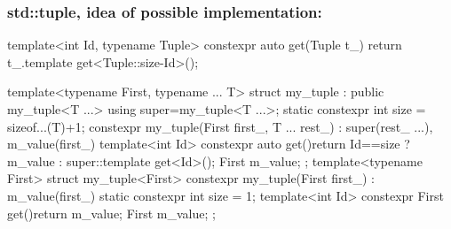 \documentclass[aspectratio=43]{beamer}
\begin{document}
\begin{frame}[fragile]\frametitle{std::tuple, idea of possible implementation:}
    \begin{Cpplisting}[: tuple]{}
template<int Id, typename Tuple>
constexpr auto get(Tuple t_){ return t_.template get<Tuple::size-Id>();}

template<typename First, typename ... T>
struct my_tuple : public my_tuple<T ...> {
    using super=my_tuple<T ...>;
    static constexpr int size = sizeof...(T)+1;
    constexpr my_tuple(First first_, T ... rest_)
    : super(rest_ ...), m_value(first_){}
    template<int Id>
    constexpr auto get(){return Id==size ? m_value
      : super::template get<Id>();}
    First m_value;
};
template<typename First>
struct my_tuple<First> {
    constexpr my_tuple(First first_) : m_value(first_){}
    static constexpr int size = 1;
    template<int Id> constexpr First get(){return m_value;}
    First m_value;
};
    \end{Cpplisting}
\end{frame}
\end{document}
